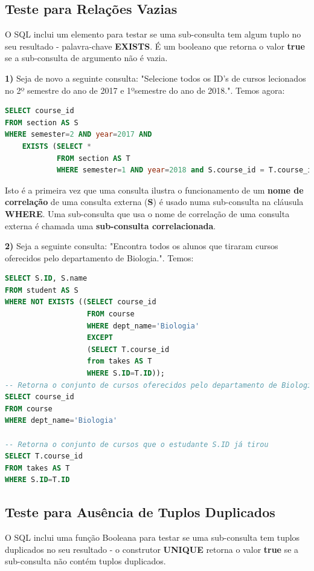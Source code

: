 \documentclass[oneside]{book}
\theoremstyle{definition}
\begin{document}
\subsection{Teste para Relações Vazias}
O SQL inclui um elemento para testar se uma sub-consulta tem algum tuplo no seu resultado - palavra-chave \textbf{EXISTS}. É um booleano que retorna o valor \textbf{true} se a sub-consulta de argumento não é vazia.

\textbf{1)} Seja de novo a seguinte consulta: "Selecione todos os ID's de cursos lecionados no 2º semestre do ano de 2017 e 1ºsemestre do ano de 2018.". Temos agora:
\begin{lstlisting}[language=SQL, morekeywords={REFERENCES, REFRESH, MATERIALIZED, CONCURRENTLY}, framesep=8pt, xleftmargin=40pt, framexleftmargin=40pt, frame=tb, framerule=0pt]
SELECT course_id
FROM section AS S 
WHERE semester=2 AND year=2017 AND
    EXISTS (SELECT *
            FROM section AS T
            WHERE semester=1 AND year=2018 and S.course_id = T.course_id);
\end{lstlisting}
Isto é a primeira vez que uma consulta ilustra o funcionamento de um \textbf{nome de correlação} de uma consulta externa (\textbf{S}) é usado numa sub-consulta na cláusula \textbf{WHERE}. Uma sub-consulta que usa o nome de correlação de uma consulta externa é chamada uma \textbf{sub-consulta correlacionada}.

\textbf{2)} Seja a seguinte consulta: "Encontra todos os alunos que tiraram cursos oferecidos pelo departamento de Biologia.". Temos:
\begin{lstlisting}[language=SQL, morekeywords={REFERENCES, REFRESH, MATERIALIZED, CONCURRENTLY}, framesep=8pt, xleftmargin=40pt, framexleftmargin=40pt, frame=tb, framerule=0pt]
SELECT S.ID, S.name
FROM student AS S 
WHERE NOT EXISTS ((SELECT course_id
                   FROM course
                   WHERE dept_name='Biologia'
                   EXCEPT
                   (SELECT T.course_id
                   from takes AS T
                   WHERE S.ID=T.ID));
-- Retorna o conjunto de cursos oferecidos pelo departamento de Biologia
SELECT course_id
FROM course
WHERE dept_name='Biologia'

-- Retorna o conjunto de cursos que o estudante S.ID já tirou
SELECT T.course_id
FROM takes AS T
WHERE S.ID=T.ID
\end{lstlisting}

\subsection{Teste para Ausência de Tuplos Duplicados}
O SQL inclui uma função Booleana para testar se uma sub-consulta tem tuplos duplicados no seu resultado - o construtor \textbf{UNIQUE} retorna o valor \textbf{true} se a sub-consulta não contém tuplos duplicados.
\end{document}
